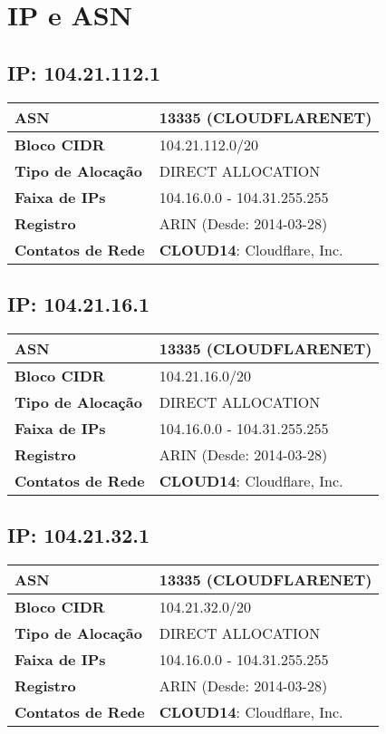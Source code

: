 \section{IP e ASN}

    \subsection{IP: 104.21.112.1}
    \begin{tabular}{|l|l|}
    \hline
    \textbf{ASN} & 13335 (CLOUDFLARENET) \\ \hline
    \textbf{Bloco CIDR} & 104.21.112.0/20 \\ \hline
    \textbf{Tipo de Alocação} & DIRECT ALLOCATION \\ \hline
    \textbf{Faixa de IPs} & 104.16.0.0 - 104.31.255.255 \\ \hline
    \textbf{Registro} & ARIN (Desde: 2014-03-28) \\ \hline
        
\textbf{Contatos de Rede} & \textbf{CLOUD14}: Cloudflare, Inc. 
\\ \hline
\end{tabular}


    \subsection{IP: 104.21.16.1}
    \begin{tabular}{|l|l|}
    \hline
    \textbf{ASN} & 13335 (CLOUDFLARENET) \\ \hline
    \textbf{Bloco CIDR} & 104.21.16.0/20 \\ \hline
    \textbf{Tipo de Alocação} & DIRECT ALLOCATION \\ \hline
    \textbf{Faixa de IPs} & 104.16.0.0 - 104.31.255.255 \\ \hline
    \textbf{Registro} & ARIN (Desde: 2014-03-28) \\ \hline
        
\textbf{Contatos de Rede} & \textbf{CLOUD14}: Cloudflare, Inc. 
\\ \hline
\end{tabular}


    \subsection{IP: 104.21.32.1}
    \begin{tabular}{|l|l|}
    \hline
    \textbf{ASN} & 13335 (CLOUDFLARENET) \\ \hline
    \textbf{Bloco CIDR} & 104.21.32.0/20 \\ \hline
    \textbf{Tipo de Alocação} & DIRECT ALLOCATION \\ \hline
    \textbf{Faixa de IPs} & 104.16.0.0 - 104.31.255.255 \\ \hline
    \textbf{Registro} & ARIN (Desde: 2014-03-28) \\ \hline
        
\textbf{Contatos de Rede} & \textbf{CLOUD14}: Cloudflare, Inc. 
\\ \hline
\end{tabular}


